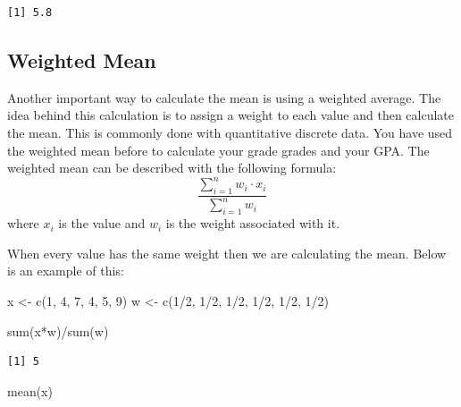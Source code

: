 \documentclass[
  letterpaper,
  DIV=11,
  numbers=noendperiod]{scrreprt}
\newenvironment{Shaded}{\begin{snugshade}}{\end{snugshade}}
\newcommand{\DecValTok}[1]{\textcolor[rgb]{0.68,0.00,0.00}{#1}}
\newcommand{\FunctionTok}[1]{\textcolor[rgb]{0.28,0.35,0.67}{#1}}
\newcommand{\NormalTok}[1]{\textcolor[rgb]{0.00,0.23,0.31}{#1}}
\newcommand{\OtherTok}[1]{\textcolor[rgb]{0.00,0.23,0.31}{#1}}
\newcommand{\SpecialCharTok}[1]{\textcolor[rgb]{0.37,0.37,0.37}{#1}}
\begin{document}
\begin{verbatim}
[1] 5.8
\end{verbatim}

\subsection{Weighted Mean}\label{weighted-mean}

Another important way to calculate the mean is using a weighted average.
The idea behind this calculation is to assign a weight to each value and
then calculate the mean. This is commonly done with quantitative
discrete data. You have used the weighted mean before to calculate your
grade grades and your GPA. The weighted mean can be described with the
following formula:
\[ \frac{\sum_{i=1}^n w_i\cdot x_i}{\sum_{i=1}^n w_i} \] where \(x_i\)
is the value and \(w_i\) is the weight associated with it.

When every value has the same weight then we are calculating the mean.
Below is an example of this:

\begin{Shaded}
\begin{Highlighting}[]
\NormalTok{x }\OtherTok{\textless{}{-}} \FunctionTok{c}\NormalTok{(}\DecValTok{1}\NormalTok{, }\DecValTok{4}\NormalTok{, }\DecValTok{7}\NormalTok{, }\DecValTok{4}\NormalTok{, }\DecValTok{5}\NormalTok{, }\DecValTok{9}\NormalTok{)}
\NormalTok{w }\OtherTok{\textless{}{-}} \FunctionTok{c}\NormalTok{(}\DecValTok{1}\SpecialCharTok{/}\DecValTok{2}\NormalTok{, }\DecValTok{1}\SpecialCharTok{/}\DecValTok{2}\NormalTok{, }\DecValTok{1}\SpecialCharTok{/}\DecValTok{2}\NormalTok{, }\DecValTok{1}\SpecialCharTok{/}\DecValTok{2}\NormalTok{, }\DecValTok{1}\SpecialCharTok{/}\DecValTok{2}\NormalTok{, }\DecValTok{1}\SpecialCharTok{/}\DecValTok{2}\NormalTok{)}

\FunctionTok{sum}\NormalTok{(x}\SpecialCharTok{*}\NormalTok{w)}\SpecialCharTok{/}\FunctionTok{sum}\NormalTok{(w)}
\end{Highlighting}
\end{Shaded}

\begin{verbatim}
[1] 5
\end{verbatim}

\begin{Shaded}
\begin{Highlighting}[]
\FunctionTok{mean}\NormalTok{(x)}
\end{Highlighting}
\end{Shaded}
\end{document}
